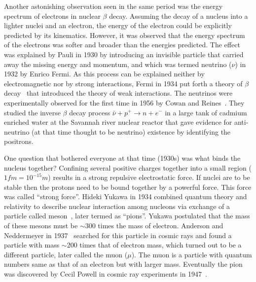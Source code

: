 Another astonishing observation seen in the same period was the energy spectrum of electrons in nuclear $\beta$ decay. Assuming the decay of 
a nucleus into a lighter nuclei and an electron, the energy of the electron could be explicitly predicted by its kinematics. However, it was
observed that the energy spectrum of the electrons was softer and broader than the energies predicted. The effect was explained by Pauli in 
1930 by introducing an invisible particle that carried away the missing energy and momentum, and which was termed neutrino ($\nu$) in 1932 by 
Enrico Fermi. As this process can be explained neither by electromagnetic nor by strong interactions, Fermi in 1934 put forth a theory of 
$\beta$ decay~\cite{Fermi1934} that introduced the theory of weak interactions. The neutrinos were experimentally observed for the first time 
in 1956 by Cowan and Reines~\cite{Cowan:1992xc}. They studied the inverse $\beta$ decay process $\bar{\nu}+p^{+}\to{n}+e^{-}$ in a large tank of 
cadmium enriched water at the Savannah river nuclear reactor that gave evidence for anti-neutrino (at that time thought to be neutrino) existence 
by identifying the positrons. 

One question that bothered everyone at that time (1930s) was what binds the nucleus together? Confining several positive charges together into a
small region ($1\unit{fm}=10^{-15}\unit{m}$) results in a strong repulsive electrostatic force. If nuclei are to be stable then the protons
need to be bound together by a powerful force. This force was called ``strong force''. Hideki Yukawa in 1934 combined quantum theory and
relativity to describe nuclear interaction among nucleons via exchange of a particle called meson~\cite{Yukawa:1935xg}, later termed
as ``pions''. Yukawa postulated that the mass of these mesons must be $\sim300$ times the mass of electron. Anderson and Neddermeyer
in 1937~\cite{Neddermeyer:1937md} searched for this particle in cosmic rays and found a particle with mass $\sim200$ times that of electron mass, 
which turned out to be a different particle, later called the muon ($\mu$). The muon is a particle with quantum numbers same as that of an electron 
but with larger mass. Eventually the pion was discovered by Cecil Powell in cosmic ray experiments in 1947~\cite{Lattes:1947mx}.

